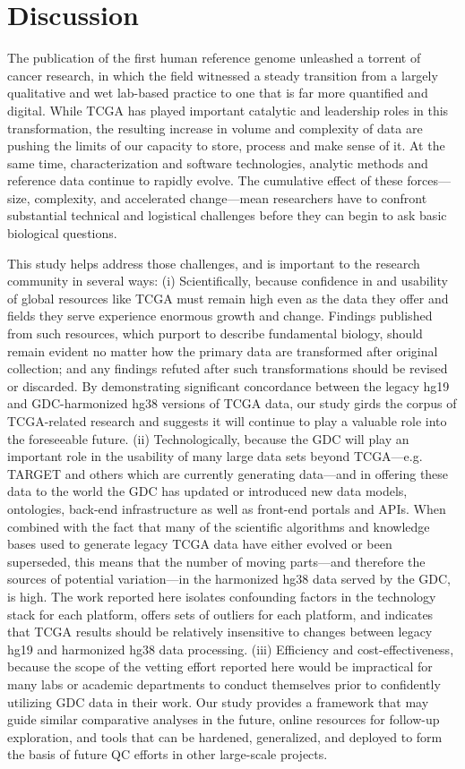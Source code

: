 \section{Discussion}
The publication of the first human reference genome unleashed a torrent of cancer research, in which the field witnessed a steady transition from a largely qualitative and wet lab-based practice to one that is far more quantified and digital. While TCGA has played important catalytic and leadership roles in this transformation, the resulting increase in volume and complexity of data are pushing the limits of our capacity to store, process and make sense of it. At the same time, characterization and software technologies, analytic methods and reference data continue to rapidly evolve. The cumulative effect of these forces---size, complexity, and accelerated change---mean researchers have to confront substantial technical and logistical challenges before they can begin to ask basic biological questions.

This study helps address those challenges, and is important to the research community in several ways: (i) Scientifically, because confidence in and usability of global resources like TCGA must remain high even as the data they offer and fields they serve experience enormous growth and change. Findings published from such resources, which purport to describe fundamental biology, should remain evident no matter how the primary data are transformed after original collection; and any findings refuted after such transformations should be revised or discarded. By demonstrating significant concordance between the legacy hg19 and GDC-harmonized hg38 versions of TCGA data, our study girds the corpus of TCGA-related research and suggests it will continue to play a valuable role into the foreseeable future. (ii) Technologically, because the GDC will play an important role in the usability of many large data sets beyond TCGA---e.g. TARGET and others which are currently generating data---and in offering these data to the world the GDC has updated or introduced new data models, ontologies, back-end infrastructure as well as front-end portals and APIs. When combined with the fact that many of the scientific algorithms and knowledge bases used to generate legacy TCGA data have either evolved or been superseded, this means that the number of moving parts—and therefore the sources of potential variation—in the harmonized hg38 data served by the GDC, is high. The work reported here isolates confounding factors in the technology stack for each platform, offers sets of outliers for each platform, and indicates that TCGA results should be relatively insensitive to changes between legacy hg19 and harmonized hg38 data processing. (iii) Efficiency and cost-effectiveness, because the scope of the vetting effort reported here would be impractical for many labs or academic departments to conduct themselves prior to confidently utilizing GDC data in their work. Our study provides a framework that may guide similar comparative analyses in the future, online resources for follow-up exploration, and tools that can be hardened, generalized, and deployed to form the basis of future QC efforts in other large-scale projects.
